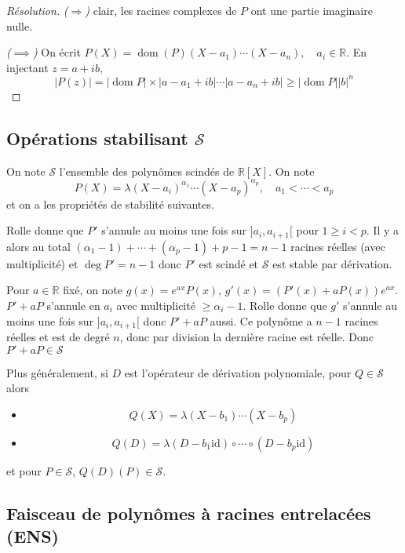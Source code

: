 \documentclass{article}
\theoremstyle{definition}
\DeclareMathOperator{\dom}{dom}
\begin{document}
\begin{proof}[Résolution]
    \emph{($\Longrightarrow$)} clair, les racines complexes de $P$ ont une partie imaginaire nulle.

     \emph{($\implies$)} On écrit $P(X)=\dom(P)(X-a_1)\cdots (X-a_n), \quad a_i\in\mathbb R$. En injectant $z=a+ib$, \[
        |P(z)|=|\dom P|\times |a-a_1+ib| \cdots |a-a_n+ib|\geq |\dom P| |b|^n
    \]
\end{proof}

\subsection{Opérations stabilisant $\mathcal S$}

On note $\mathcal S$ l'ensemble des polynômes scindés de $\mathbb R[X]$. On note \[
    P(X)=\lambda (X-a_i)^{\alpha_1}\cdots (X-a_p)^{\alpha_p}, \quad a_1<\cdots <a_p
\]
et on a les propriétés de stabilité suivantes.

\vspace{.2cm}

 Rolle donne que $P'$ s'annule au moins une fois sur $]a_i, a_{i+1}[$ pour $1\geq i < p$. Il y a alors au total $(\alpha_1-1)+\cdots+(\alpha_p-1)+p-1=n-1$ racines réelles (avec multiplicité) et $\deg P'=n-1$ donc $P'$ est scindé et $\mathcal S$ est stable par dérivation.

\vspace{.2cm}

 Pour $a\in\mathbb R$ fixé, on note $g(x)=e^{ax}P(x)$, $g'(x)=(P'(x)+aP(x))e^{ax}$. $P'+aP$ s'annule en $a_i$ avec multiplicité $\geq \alpha_i-1$. Rolle donne que $g'$ s'annule au moins une fois sur $]a_i, a_{i+1}[$ donc $P'+aP$ aussi. Ce polynôme a $n-1$ racines réelles et est de degré $n$, donc par division la dernière racine est réelle. Donc $P'+aP\in\mathcal S$

\vspace{.2cm}

 Plus généralement, si $D$ est l'opérateur de dérivation polynomiale, pour $Q\in\mathcal S$ alors 
\begin{itemize}
    \item 
\[
    Q(X)=\lambda (X-b_1)\cdots (X-b_p)
\]
\item \[
        Q(D)=\lambda(D-b_1\mathrm{id})\circ \cdots \circ (D-b_p \mathrm{id})
    \]
\end{itemize}
et pour $P\in\mathcal S$, $Q(D)(P)\in\mathcal S$.

\subsection{Faisceau de polynômes à racines entrelacées (ENS)}
\end{document}
